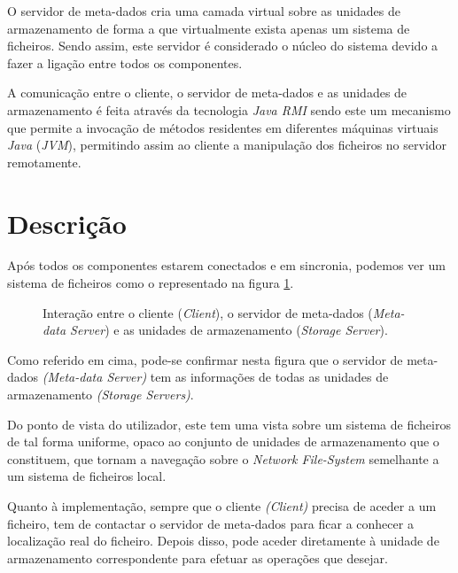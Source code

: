 \documentclass{article}
\begin{document}
O servidor de meta-dados cria uma camada virtual sobre as unidades de armazenamento de forma a que virtualmente exista apenas um sistema de ficheiros. Sendo assim, este servidor é considerado o núcleo do sistema devido a fazer a ligação entre todos os componentes.

A comunicação entre o cliente, o servidor de meta-dados e as unidades de armazenamento é feita através da tecnologia \textit{Java RMI} sendo este um mecanismo que permite a invocação de métodos residentes em diferentes máquinas virtuais \textit{Java} (\textit{JVM}), permitindo assim ao cliente a manipulação dos ficheiros no servidor remotamente.

\newpage

\section{Descrição}

Após todos os componentes estarem conectados e em sincronia, podemos ver um sistema de ficheiros como o representado na figura \ref{fig:scheme}.\\

\begin{figure}[h]
\def\svgwidth{1\textwidth\centering}
\caption{Interação entre o cliente (\textit{Client}), o servidor de meta-dados (\textit{Meta-data Server}) e as unidades de armazenamento (\textit{Storage Server}).}
\par
{}
\label{fig:scheme}
\end{figure}

Como referido em cima, pode-se confirmar nesta figura que o servidor de meta-dados \textit{(Meta-data Server)} tem as informações de todas as unidades de armazenamento \textit{(Storage Servers)}.

Do ponto de vista do utilizador, este tem uma vista sobre um sistema de ficheiros de tal forma uniforme, opaco ao conjunto de unidades de armazenamento que o constituem, que tornam a navegação sobre o \textit{Network File-System} semelhante a um sistema de ficheiros local. 

Quanto à implementação, sempre que o cliente \textit{(Client)} precisa de aceder a um ficheiro, tem de contactar o servidor de meta-dados para ficar a conhecer a localização real do ficheiro. Depois disso, pode aceder diretamente à unidade de armazenamento correspondente para efetuar as operações que desejar.
\end{document}

